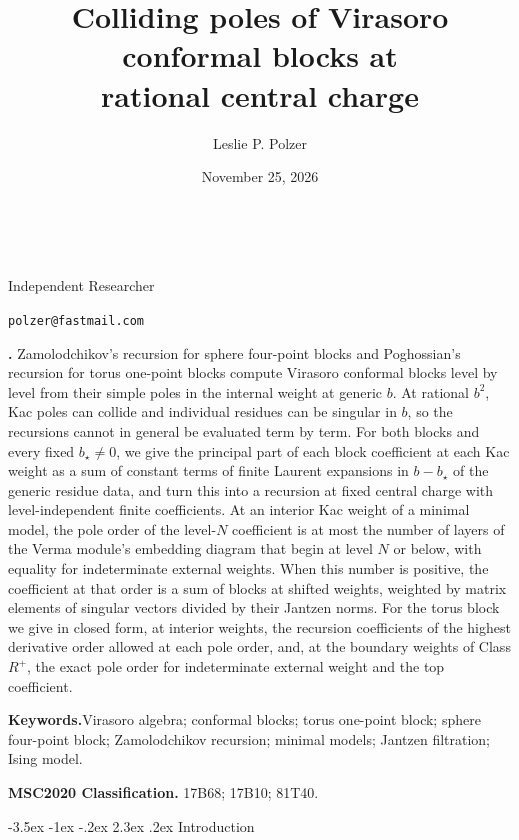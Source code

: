 \documentclass[twoside,10pt]{article}
\title{Colliding poles of Virasoro conformal blocks at\\
rational central charge}
\author{Leslie P. Polzer}
\date{November 25, 2026}
\makeatletter
\numberwithin{equation}{section}
\theoremstyle{slbody}
\theoremstyle{definition}
\theoremstyle{remark}
\newcommand{\authoraffiliation}{Independent Researcher}
\newcommand{\authoremail}{polzer@fastmail.com}
\renewcommand{\section}{%
  \@startsection{section}{1}{\z@}%
    {-3.5ex \@plus -1ex \@minus -.2ex}%
    {2.3ex \@plus .2ex}%
    {\normalfont\large\bfseries}}
\renewcommand{\maketitle}{%
  \begin{center}
    {\large\bfseries\@title}\\
    \vskip36pt
    \ifx\@author\@empty
      \mbox{}\par
    \else
      {\scshape\@author}\par
      \medskip
      {\small\authoraffiliation}\par
      \smallskip
      {\small\texttt{\authoremail}}\par
      \smallskip
      {\small\@date}\par
    \fi
    \vskip36pt
  \end{center}}
\renewenvironment{abstract}
  {\quotation\noindent\small{\bfseries\abstractname.\enspace}}
  {\endquotation}
\makeatother
\begin{document}
\maketitle

\begin{abstract}
Zamolodchikov's recursion for sphere four-point blocks and Poghossian's
recursion for torus one-point blocks compute Virasoro conformal blocks level
by level from their simple poles in the internal weight at generic \(b\).  At
rational \(b^2\), Kac poles can collide and individual residues can be
singular in \(b\), so the recursions cannot in general be evaluated term by
term.  For both blocks and every fixed \(b_\star\ne0\), we give the principal
part of each block coefficient at each Kac weight as a sum of constant terms
of finite Laurent expansions in \(b-b_\star\) of the generic residue data, and
turn this into a recursion at fixed central charge with level-independent
finite coefficients.  At an interior Kac weight of a
minimal model, the pole order of the level-\(N\) coefficient is at most the
number of layers of the Verma module's embedding diagram that begin at
level \(N\) or below, with equality for indeterminate external weights.  When
this number is positive, the coefficient at that order is a sum of blocks at
shifted weights, weighted by matrix elements of singular vectors divided by
their Jantzen norms.  For the torus block we give in closed form, at
interior weights, the recursion coefficients of the highest derivative order
allowed at each pole order, and, at the boundary weights of Class \(R^+\),
the exact pole order for indeterminate external weight and the top
coefficient.

\vskip5pt
\noindent\textbf{Keywords.}\enspace Virasoro algebra; conformal blocks;
torus one-point block; sphere four-point block; Zamolodchikov recursion;
minimal models; Jantzen filtration; Ising model.

\vskip5pt
\noindent\textbf{MSC2020 Classification.}\enspace
17B68; 17B10; 81T40.
\end{abstract}

\vskip24pt
\baselineskip=13.5pt

\section{Introduction}
\end{document}
